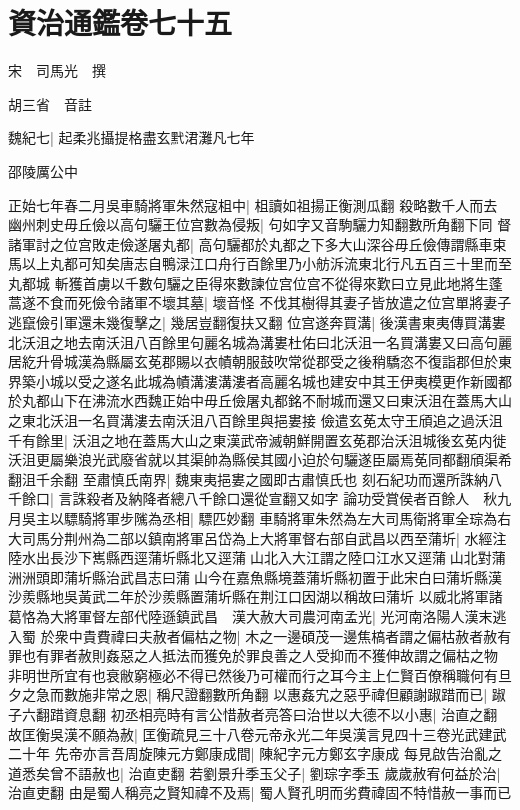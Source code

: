 \section{資治通鑑卷七十五}
宋　司馬光　撰

胡三省　音註

魏紀七|{
	起柔兆攝提格盡玄黓涒灘凡七年}


邵陵厲公中

正始七年春二月吳車騎將軍朱然寇柤中|{
	柤讀如祖揚正衡測瓜翻}
殺略數千人而去　幽州刺史毋丘儉以高句驪王位宫數為侵叛|{
	句如字又音駒驪力知翻數所角翻下同}
督諸軍討之位宫敗走儉遂屠丸都|{
	高句驪都於丸都之下多大山深谷毋丘儉傳謂縣車束馬以上丸都可知矣唐志自鴨渌江口舟行百餘里乃小舫泝流東北行凡五百三十里而至丸都城}
斬獲首虜以千數句驪之臣得來數諫位宫位宫不從得來歎曰立見此地將生蓬蒿遂不食而死儉令諸軍不壞其墓|{
	壞音怪}
不伐其樹得其妻子皆放遣之位宫單將妻子逃竄儉引軍還未幾復擊之|{
	幾居豈翻復扶又翻}
位宫遂奔買溝|{
	後漢書東夷傳買溝婁北沃沮之地去南沃沮八百餘里句麗名城為溝婁杜佑曰北沃沮一名買溝婁又曰高句麗居紇升骨城漢為縣屬玄莬郡賜以衣幘朝服鼓吹常從郡受之後稍驕恣不復詣郡但於東界築小城以受之遂名此城為幘溝漊溝漊者高麗名城也建安中其王伊夷模更作新國都於丸都山下在沸流水西魏正始中毋丘儉屠丸都銘不耐城而還又曰東沃沮在蓋馬大山之東北沃沮一名買溝漊去南沃沮八百餘里與挹婁接}
儉遣玄莬太守王頎追之過沃沮千有餘里|{
	沃沮之地在蓋馬大山之東漢武帝滅朝鮮開置玄莬郡治沃沮城後玄莬内徙沃沮更屬樂浪光武廢省就以其渠帥為縣侯其國小迫於句驪遂臣屬焉莬同都翻頎渠希翻沮千余翻}
至肅慎氏南界|{
	魏東夷挹婁之國即古肅慎氏也}
刻石紀功而還所誅納八千餘口|{
	言誅殺者及納降者總八千餘口還從宣翻又如字}
論功受賞侯者百餘人　秋九月吳主以驃騎將軍步隲為丞相|{
	驃匹妙翻}
車騎將軍朱然為左大司馬衛將軍全琮為右大司馬分荆州為二部以鎮南將軍呂岱為上大將軍督右部自武昌以西至蒲圻|{
	水經注陸水出長沙下嶲縣西逕蒲圻縣北又逕蒲山北入大江謂之陸口江水又逕蒲山北對蒲洲洲頭即蒲圻縣治武昌志曰蒲山今在嘉魚縣境蓋蒲圻縣初置于此宋白曰蒲圻縣漢沙羨縣地吳黃武二年於沙羨縣置蒲圻縣在荆江口因湖以稱故曰蒲圻}
以威北將軍諸葛恪為大將軍督左部代陸遜鎮武昌　漢大赦大司農河南孟光|{
	光河南洛陽人漢末逃入蜀}
於衆中貴費禕曰夫赦者偏枯之物|{
	木之一邊碩茂一邊焦槁者謂之偏枯赦者赦有罪也有罪者赦則姦惡之人抵法而獲免於罪良善之人受抑而不獲伸故謂之偏枯之物}
非明世所宜有也衰敝窮極必不得已然後乃可權而行之耳今主上仁賢百僚稱職何有旦夕之急而數施非常之恩|{
	稱尺證翻數所角翻}
以惠姦宄之惡乎禕但顧謝踧踖而已|{
	踧子六翻踖資息翻}
初丞相亮時有言公惜赦者亮答曰治世以大德不以小惠|{
	治直之翻}
故匡衡吳漢不願為赦|{
	匡衡疏見三十八卷元帝永光二年吳漢言見四十三卷光武建武二十年}
先帝亦言吾周旋陳元方鄭康成間|{
	陳紀字元方鄭玄字康成}
每見啟告治亂之道悉矣曾不語赦也|{
	治直吏翻}
若劉景升季玉父子|{
	劉琮字季玉}
歲歲赦宥何益於治|{
	治直吏翻}
由是蜀人稱亮之賢知禕不及焉|{
	蜀人賢孔明而劣費禕固不特惜赦一事而已}



